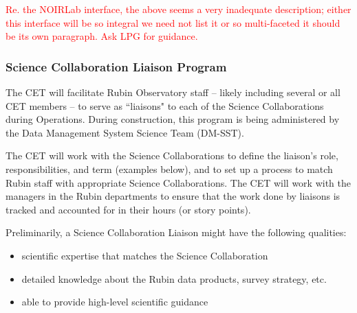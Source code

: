 \documentclass[DM,lsstdraft,toc]{lsstdoc}
\begin{document}
\textcolor{red}{Re. the NOIRLab interface, the above seems a very inadequate description; either this interface will be so integral we need not list it or so multi-faceted it should be its own paragraph. Ask LPG for guidance.}


\subsubsection{Science Collaboration Liaison Program}\label{sssec:mod_interface_SCliaison}

The CET will facilitate Rubin Observatory staff -- likely including several or all CET members -- to serve as ``liaisons" to each of the Science Collaborations during Operations. 
During construction, this program is being administered by the Data Management System Science Team (DM-SST).

The CET will work with the Science Collaborations to define the liaison's role, responsibilities, and term (examples below), and to set up a process to match Rubin staff with appropriate Science Collaborations.
The CET will work with the managers in the Rubin departments to ensure that the work done by liaisons is tracked and accounted for in their hours (or story points). 

Preliminarily, a Science Collaboration Liaison might have the following qualities:
\begin{itemize}
\item scientific expertise that matches the Science Collaboration
\item detailed knowledge about the Rubin data products, survey strategy, etc. 
\item able to provide high-level scientific guidance 
\end{itemize}
\end{document}
